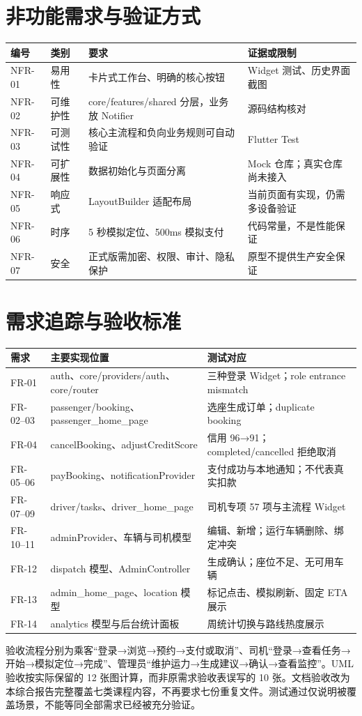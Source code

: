 \documentclass[UTF8,fontset=fandol,zihao=-4,oneside]{ctexrep}
\begin{document}
\section{非功能需求与验证方式}
\begin{longtable}{p{1.2cm}p{2.5cm}p{6.5cm}p{4.5cm}}
\toprule 编号 & 类别 & 要求 & 证据或限制 \\ \midrule
NFR-01 & 易用性 & 卡片式工作台、明确的核心按钮 & Widget 测试、历史界面截图 \\
NFR-02 & 可维护性 & core/features/shared 分层，业务放 Notifier & 源码结构核对 \\
NFR-03 & 可测试性 & 核心主流程和负向业务规则可自动验证 & Flutter Test \\
NFR-04 & 可扩展性 & 数据初始化与页面分离 & Mock 仓库；真实仓库尚未接入 \\
NFR-05 & 响应式 & LayoutBuilder 适配布局 & 当前页面有实现，仍需多设备验证 \\
NFR-06 & 时序 & 5 秒模拟定位、500ms 模拟支付 & 代码常量，不是性能保证 \\
NFR-07 & 安全 & 正式版需加密、权限、审计、隐私保护 & 原型不提供生产安全保证 \\
\bottomrule
\end{longtable}

\section{需求追踪与验收标准}
\begin{longtable}{p{2cm}p{5.6cm}p{7.1cm}}
\toprule 需求 & 主要实现位置 & 测试对应 \\ \midrule
FR-01 & auth、core/providers/auth、core/router & 三种登录 Widget；role entrance mismatch \\
FR-02--03 & passenger/booking、passenger\_home\_page & 选座生成订单；duplicate booking \\
FR-04 & cancelBooking、adjustCreditScore & 信用 96→91；completed/cancelled 拒绝取消 \\
FR-05--06 & payBooking、notificationProvider & 支付成功与本地通知；不代表真实扣款 \\
FR-07--09 & driver/tasks、driver\_home\_page & 司机专项 57 项与主流程 Widget \\
FR-10--11 & adminProvider、车辆与司机模型 & 编辑、新增；运行车辆删除、绑定冲突 \\
FR-12 & dispatch 模型、AdminController & 生成确认；座位不足、无可用车辆 \\
FR-13 & admin\_home\_page、location 模型 & 标记点击、模拟刷新、固定 ETA 展示 \\
FR-14 & analytics 模型与后台统计面板 & 周统计切换与路线热度展示 \\
\bottomrule
\end{longtable}
验收流程分别为乘客“登录→浏览→预约→支付或取消”、司机“登录→查看任务→开始→模拟定位→完成”、管理员“维护运力→生成建议→确认→查看监控”。UML 验收按实际保留的 12 张图计算，而非原需求验收表误写的 10 张。文档验收改为本综合报告完整覆盖七类课程内容，不再要求七份重复文件。测试通过仅说明被覆盖场景，不能等同全部需求已经被充分验证。
\end{document}
